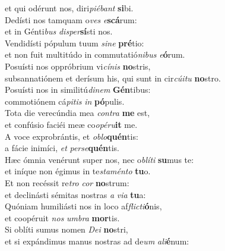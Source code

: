 \evenverse et qui odérunt nos, diri\textit{pi}\textit{é}\textit{bant} \textbf{si}bi.\\
\oddverse Dedísti nos tamquam o\textit{ves} \textit{e}\textbf{scá}rum:~\*\\
\oddverse et in Génti\textit{bus} \textit{di}\textit{sper}\textbf{sí}sti nos.\\
\evenverse Vendidísti pópulum tuum \textit{si}\textit{ne} \textbf{pré}tio:~\*\\
\evenverse et non fuit multitúdo in commutatió\textit{ni}\textit{bus} \textit{e}\textbf{ó}rum.\\
\oddverse Posuísti nos oppróbrium vi\textit{cí}\textit{nis} \textbf{no}stris,~\*\\
\oddverse subsannatiónem et derísum his, qui sunt in cir\textit{cú}\textit{i}\textit{tu} \textbf{no}stro.\\
\evenverse Posuísti nos in similitú\textit{di}\textit{nem} \textbf{Gén}tibus:~\*\\
\evenverse commotiónem cá\textit{pi}\textit{tis} \textit{in} \textbf{pó}pulis.\\
\oddverse Tota die verecúndia mea \textit{con}\textit{tra} \textbf{me} est,~\*\\
\oddverse et confúsio faciéi meæ co\textit{o}\textit{pé}\textit{ru}\textbf{it} me.\\
\evenverse A voce exprobrántis, et \textit{o}\textit{blo}\textbf{quén}tis:~\*\\
\evenverse a fácie inimíci, \textit{et} \textit{per}\textit{se}\textbf{quén}tis.\\
\oddverse Hæc ómnia venérunt super nos, nec o\textit{blí}\textit{ti} \textbf{su}mus te:~\*\\
\oddverse et iníque non égimus in te\textit{sta}\textit{mén}\textit{to} \textbf{tu}o.\\
\evenverse Et non recéssit re\textit{tro} \textit{cor} \textbf{no}strum:~\*\\
\evenverse et declinásti sémitas nostras \textit{a} \textit{vi}\textit{a} \textbf{tu}a:\\
\oddverse Quóniam humiliásti nos in loco af\textit{fli}\textit{cti}\textbf{ó}nis,~\*\\
\oddverse et coopéruit \textit{nos} \textit{um}\textit{bra} \textbf{mor}tis.\\
\evenverse Si oblíti sumus nomen \textit{De}\textit{i} \textbf{no}stri,~\*\\
\evenverse et si expándimus manus nostras ad de\textit{um} \textit{a}\textit{li}\textbf{é}num:\\
